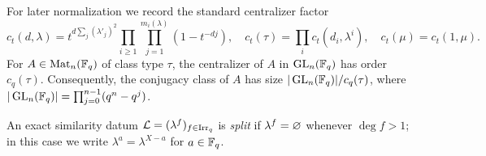 
For later normalization we record the standard centralizer factor
\begin{equation}
 c_t(d,\lambda)=t^{d\sum_j(\lambda'_j)^2}
   {\prod_{i\geq1}\prod_{j=1}^{m_i(\lambda)}(1-t^{-dj})},\quad
 c_t(\tau)=\prod_i c_t(d_i,\lambda^i),\quad c_t(\mu)=c_t(1,\mu).
 \label{eq:primary-centralizer-factor}
\end{equation}
{For $A\in\operatorname{Mat}_n(\mathbb F_q)$ of class type $\tau$,
the centralizer of $A$ in $\operatorname{GL}_n(\mathbb F_q)$ has order $c_q(\tau)$.
Consequently, the conjugacy class of $A$ has size
$|\operatorname{GL}_n(\mathbb F_q)|/c_q(\tau)$, where
$|\operatorname{GL}_n(\mathbb F_q)|=\prod_{j=0}^{n-1}(q^n-q^j)$.}

{An exact similarity datum
$\mathcal L=(\lambda^f)_{f\in\operatorname{Irr}_q}$ is \emph{split} if
$\lambda^f=\varnothing$ whenever $\deg f>1$; in this case we write
$\lambda^a=\lambda^{X-a}$ for $a\in\mathbb F_q$.}

